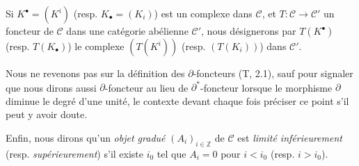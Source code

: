\begin{env}[11.2.1]
Si $K^\bullet=(K^i)$ (resp. $K_\bullet=(K_i)$) est un complexe dans
$\mathcal C$, et $T:\mathcal C\to\mathcal C'$ un foncteur de $\mathcal C$
dans une catégorie abélienne $\mathcal C'$, nous désignerons par
$T(K^\bullet)$ (resp. $T(K_\bullet)$) le complexe $(T(K^i))$ (resp.
$(T(K_i))$) dans $\mathcal C'$.

Nous ne revenons pas sur la définition des $\partial$-foncteurs (T, 2.1),
sauf pour signaler que nous dirons aussi $\partial$-foncteur au lieu de
$\partial^*$-foncteur lorsque le morphisme $\partial$ diminue le degré d'une
unité, le contexte devant chaque fois préciser ce point s'il peut y avoir
doute.

Enfin, nous dirons qu'un \emph{objet gradué} $(A_i)_{i\in\mathbb Z}$ de
$\mathcal C$ est \emph{limité inférieurement} (resp. \emph{supérieurement})
s'il existe $i_0$ tel que $A_i=0$ pour $i<i_0$ (resp. $i>i_0$).
\end{env}

